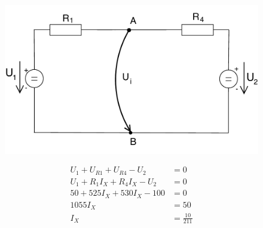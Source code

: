 \documentclass[12pt,a4paper]{article}
\begin{document}
  \begin{minipage}{\linewidth}
      \centering
      \begin{minipage}{0.45\linewidth}
          \begin{figure}[H]
              \includegraphics[width=\linewidth]{Circuits/2-B.pdf}
          \end{figure}
      \end{minipage}
      \hspace{0.05\linewidth}
      \begin{minipage}{0.45\linewidth}
      	\begin{align*}
        		U_1 + U_{R1} + U_{R4} - U_2 &= 0 \\[0.5ex]
        		U_1 + R_1I_X + R_4I_X - U_2 &= 0 \\[0.5ex]
        		50 + 525I_X + 530I_X - 100 &= 0 \\[0.5ex]
        		1055I_X &= 50 \\[0.5ex]
        		I_X &= \frac{10}{211}  \\[0.5ex]
		\end{align*}
      \end{minipage}
  \end{minipage}
  
\end{document}
